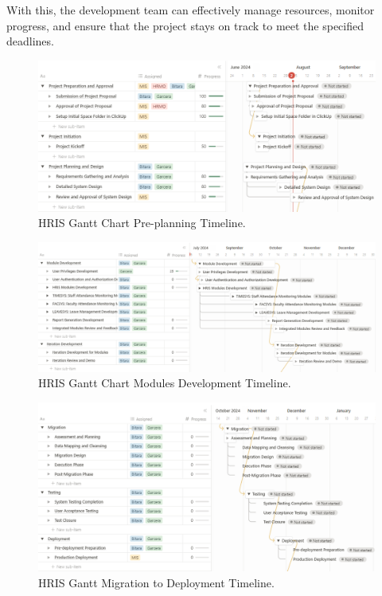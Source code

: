     With this, the development team can effectively manage resources, monitor progress, and ensure that the project stays on track to meet the specified deadlines.

    \begin{figure}[H]
        \centering
        \includegraphics[width=1\linewidth]{figures/images/gantt-chart-1.png}
        \caption{HRIS Gantt Chart Pre-planning Timeline.}
        \label{fig:gantt-chart-1}
    \end{figure}

    \begin{figure}[H]
        \centering
        \includegraphics[width=1\linewidth]{figures/images/gantt-chart-2.png}
        \caption{HRIS Gantt Chart Modules Development Timeline.}
        \label{fig:gantt-chart-2}
    \end{figure}

    \begin{figure}[H]
        \centering
        \includegraphics[width=1\linewidth]{figures/images/gantt-chart-3.png}
        \caption{HRIS Gantt Migration to Deployment Timeline.}
        \label{fig:gantt-chart-3}
    \end{figure}


